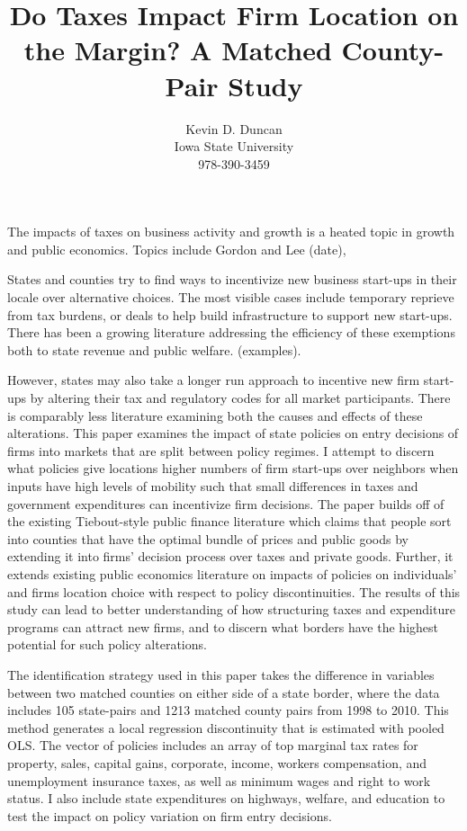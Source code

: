 \documentclass[12 pt,a4paper]{article} %
\date{} %
\begin{document}
\title{Do Taxes Impact Firm Location on the Margin? A Matched County-Pair Study}
\author{Kevin D. Duncan \\ Iowa State University \\ 978-390-3459}
\maketitle


The impacts of taxes on business activity and growth is a heated topic in growth and public economics. Topics include Gordon and Lee (date), 

States and counties try to find ways to incentivize new business start-ups in their locale over alternative choices. The most visible cases include temporary reprieve from tax burdens, or deals to help build infrastructure to support new start-ups. There has been a growing literature addressing the efficiency of these exemptions both to state revenue and public welfare. (examples). 

However, states may also take a longer run approach to incentive new firm start-ups by altering their tax and regulatory codes for all market participants. There is comparably less literature examining both the causes and effects of these alterations. This paper examines the impact of state policies on entry decisions of firms into markets that are split between policy regimes. I attempt to discern what policies give locations higher numbers of firm start-ups over neighbors when inputs have high levels of mobility such that small differences in taxes and government expenditures can incentivize firm decisions. The paper builds off of the existing Tiebout-style public finance literature which claims that people sort into counties that have the optimal bundle of prices and public goods by extending it into firms' decision process over taxes and private goods. Further, it extends existing public economics literature on impacts of policies on individuals' and firms location choice with respect to policy discontinuities. The results of this study can lead to better understanding of how structuring taxes and expenditure programs can attract new firms, and to discern what borders have the highest potential for such policy alterations.

The identification strategy used in this paper takes the difference in variables between two matched counties on either side of a state border, where the data includes 105 state-pairs and 1213 matched county pairs from 1998 to 2010. This method generates a local regression discontinuity that is estimated with pooled OLS. The vector of policies includes an array of top marginal tax rates for property, sales, capital gains, corporate, income, workers compensation, and unemployment insurance taxes, as well as minimum wages and right to work status. I also include state expenditures on highways, welfare, and education to test the impact on policy variation on firm entry decisions.
\end{document}
